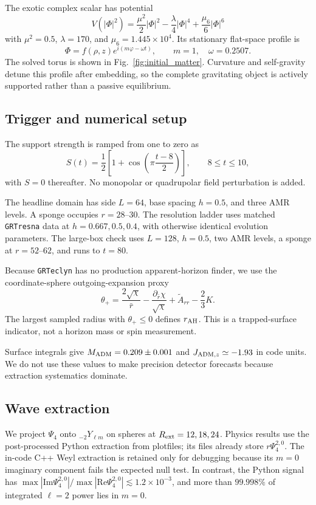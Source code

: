 \documentclass[twocolumn,aps,prd,nofootinbib,natbib]{revtex4-2}
\begin{document}
The exotic complex scalar has potential
\begin{equation}
 V(|\Phi|^2)=\frac{\mu^2}{2}|\Phi|^2-\frac{\lambda}{4}|\Phi|^4
             +\frac{\mu_6}{6}|\Phi|^6
\end{equation}
with $\mu^2=0.5$, $\lambda=170$, and $\mu_6=1.445\times10^4$. Its stationary
flat-space profile is
\begin{equation}
 \Phi=f(\rho,z)e^{i(m\varphi-\omega t)},\qquad
 m=1,\quad\omega=0.2507 .
\end{equation}
The solved torus is shown in Fig.~\ref{fig:initial_matter}. Curvature and
self-gravity detune this profile after embedding, so the complete gravitating
object is actively supported rather than a passive equilibrium.

\subsection{Trigger and numerical setup}
The support strength is ramped from one to zero as
\begin{equation}
 S(t)=\frac{1}{2}\left[1+\cos\left(\pi\frac{t-8}{2}\right)\right],
 \qquad 8\le t\le10 ,
\end{equation}
with $S=0$ thereafter. No monopolar or quadrupolar field perturbation is added.

The headline domain has side $L=64$, base spacing $h=0.5$, and three AMR levels.
A sponge occupies $r=28$--$30$. The resolution ladder uses matched
\texttt{GRTresna} data at $h=0.667,0.5,0.4$, with otherwise identical evolution
parameters. The large-box check uses $L=128$, $h=0.5$, two AMR levels, a sponge
at $r=52$--$62$, and runs to $t=80$.

Because \texttt{GRTeclyn} has no production apparent-horizon finder, we use the
coordinate-sphere outgoing-expansion proxy
\begin{equation}
 \theta_+=\frac{2\sqrt{\chi}}{\bar r}
 -\frac{\partial_{\bar r}\chi}{\sqrt{\chi}}
 +\tilde A_{rr}-\frac{2}{3}K .
\end{equation}
The largest sampled radius with $\theta_+\le0$ defines $r_{\rm AH}$. This is a
trapped-surface indicator, not a horizon mass or spin measurement.

Surface integrals give $M_{\rm ADM}=0.209\pm0.001$ and
$J_{{\rm ADM},z}\simeq-1.93$ in code units. We do not use these values to make
precision detector forecasts because extraction systematics dominate.

\subsection{Wave extraction}
\label{sec:gw_extract}
We project $\Psi_4$ onto ${}_{-2}Y_{\ell m}$ on spheres at
$R_{\rm ext}=12,18,24$. Physics results use the post-processed Python extraction
from plotfiles; its files already store $r\Psi_4^{2,0}$. The in-code C++ Weyl
extraction is retained only for debugging because its $m=0$ imaginary component
fails the expected null test. In contrast, the Python signal has
$\max|\mathrm{Im}\Psi_4^{2,0}|/\max|\mathrm{Re}\Psi_4^{2,0}|\lesssim1.2\times10^{-3}$,
and more than $99.998\%$ of integrated $\ell=2$ power lies in $m=0$.
\end{document}
